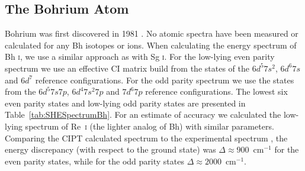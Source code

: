 \documentclass[10pt,a4paper, twoside, openright]{report}
\begin{document}
\subsection{The Bohrium Atom}  \label{sec:Bh}

 Bohrium was first discovered in 1981 \cite{Munzenberg1981}. No atomic spectra have been measured or calculated for any Bh isotopes or ions. When calculating the energy spectrum of Bh \textsc{i}, we use a similar approach as with Sg \textsc{i}.  For the low-lying even parity spectrum we use an effective CI matrix build from the states of the $6d^5 7s^2$, $6d^6 7s$ and $6d^7$ reference configurations. For the odd parity spectrum we use the states from the $6d^5 7s 7p$, $6d^4 7s^2 7p$ and $7d^6 7p$ reference configurations. The lowest six even parity states and low-lying odd parity states are presented in Table~\ref{tab:SHESpectrumBh}. For an estimate of accuracy we calculated the low-lying spectrum of Re~\textsc{i} (the lighter analog of Bh) with similar parameters. Comparing the CIPT calculated spectrum to the experimental spectrum \cite{NIST_ASD}, the energy discrepancy (with respect to the ground state) was $\Delta \approx 900$~cm$^{-1}$ for the even parity states, while for the odd parity states $\Delta \approx 2000$~cm$^{-1}$.\\
\linebreak
\end{document}
